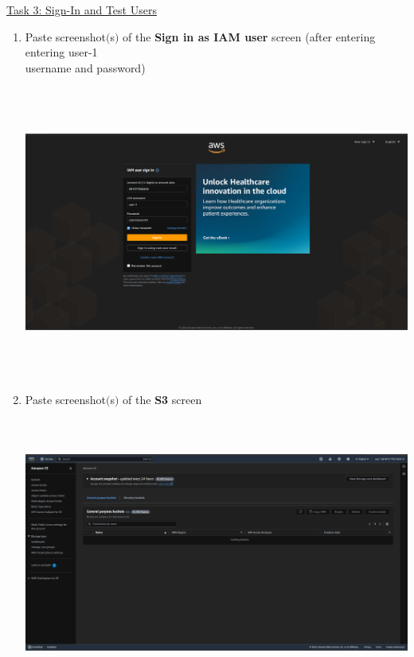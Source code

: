 \documentclass[11pt]{article}
\begin{document}
\newpage

\noindent\underline{Task 3: Sign-In and Test Users}
\begin{enumerate}[resume]
    \item Paste screenshot$($s$)$ of the \textbf{Sign in as IAM user} screen (after entering entering user-1 \\ username and password) \\
    \vspace{5mm}

    {\centering
    \includegraphics[width=6.1in, height=3.8in]{pics/7.png}
    }


     \item Paste screenshot$($s$)$ of the \textbf{S3} screen\\
     


    {\centering
    \includegraphics[width=6.1in, height=3.8in]{pics/8.png}
    }


\end{enumerate}
\end{document}
